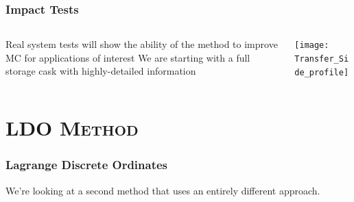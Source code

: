 \documentclass[handout]{beamer}
\renewcommand{\(}{\begin{columns}}
\renewcommand{\)}{\end{columns}}
\newcommand{\<}[1]{\begin{column}{#1}}
\renewcommand{\>}{\end{column}}
\begin{document}
\begin{frame}[fragile]

  \frametitle{Impact Tests}
  
    \begin{columns}
    \begin{column}{0.55\textwidth}
    Real system tests will show the ability of the method to improve MC for applications of interest
    \vspace*{1em}
    We are starting with a full storage cask with highly-detailed information
    \end{column}    
    \begin{column}{0.45\textwidth}
  \begin{center}
  \texttt{[image: Transfer\_Side\_profile]}  
  \end{center}
    \end{column}
  \end{columns}   

\end{frame}



\section{\scshape LDO Method}
\begin{frame}[fragile]

  \frametitle{Lagrange Discrete Ordinates \cite{Ahrens2015}}

   We're looking at a second method that uses an entirely different approach.    
%    

\end{frame}
\end{document}
